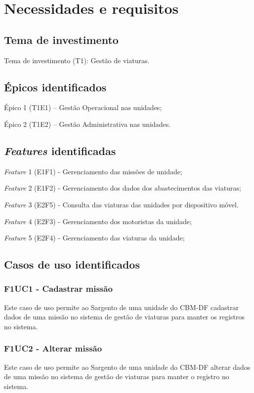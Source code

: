 \chapter{Necessidades e requisitos}
  
  \section{Tema de investimento}
  
  Tema de investimento (T1): Gestão de viaturas.
  
  \section{Épicos identificados}
    
  Épico 1 (T1E1) – Gestão Operacional nas unidades;
  
  Épico 2 (T1E2) – Gestão Administrativa nas unidades.
  
  \section{\textit{Features} identificadas}
  
  \textit{Feature} 1 (E1F1) - Gerenciamento das missões de unidade;
  
  \textit{Feature} 2 (E1F2) - Gerenciamento dos dados dos abastecimentos das viaturas;
  
   \textit{Feature} 3 (E2F5) - Consulta das viaturas das unidades por dispositivo móvel. 
  
  \textit{Feature} 4 (E2F3) - Gerenciamento dos motoristas da unidade;
  
  \textit{Feature} 5 (E2F4) - Gerenciamento das viaturas da unidade;
  
 
  
  \section{Casos de uso identificados} 

  \subsection{F1UC1 - Cadastrar missão}
Este caso de uso permite ao Sargento de uma unidade do CBM-DF cadastrar dados de uma missão no sistema de gestão de viaturas para manter os registros no sistema.
  \subsection{F1UC2 - Alterar missão}
Este caso de uso permite ao Sargento de uma unidade do CBM-DF alterar dados de uma missão no sistema de gestão de viaturas para manter o registro no sistema.

